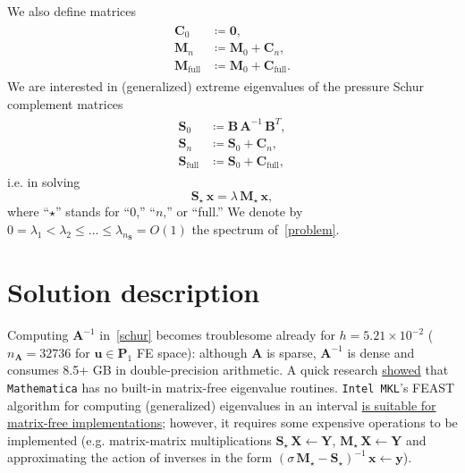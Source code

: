 \documentclass[12pt]{article}
\newcommand{\vect}[1]{\boldsymbol{\mathbf{#1}}}
\begin{document}
We also define matrices 
\begin{align}\begin{split}
	\vect C_0 &\coloneqq \vect 0,\\
	\vect M_n &\coloneqq \vect M_0 + \vect C_n,\\
	\vect M_{\text{full}} &\coloneqq \vect M_0 + \vect C_{\text{full}}.
\end{split}\end{align}
We are interested in (generalized) extreme eigenvalues of the pressure Schur complement matrices
\begin{align}\label{schur}\begin{split}
	\vect S_0 &\coloneqq \vect B\,\vect A^{-1}\,\vect B^{T},\\
	\vect S_n &\coloneqq \vect S_0 + \vect C_n,\\
	\vect S_{\text{full}} &\coloneqq \vect S_0 + \vect C_{\text{full}},
\end{split}\end{align}
i.e. in solving
\begin{equation}\label{problem}
	\vect S_\star\,\vect x = \lambda\,\vect M_\star\,\vect x,
\end{equation}
where ``$\star$'' stands for ``$0$,'' ``$n$,'' or ``full.'' We denote by~$0 = \lambda_1 < \lambda_2 \le \dots \le \lambda_{n_{\vect S}} = O(1)$ the spectrum of~\eqref{problem}.

\section{Solution description}

Computing $\vect A^{-1}$ in~\eqref{schur} becomes troublesome already for $h = 5.21\times10^{-2}$ ($n_{\vect A} = 32736$ for $\vect u \in \vect P_1$ FE space): although $\vect A$ is sparse, $\vect A^{-1}$ is dense and consumes 8.5+ GB in double-precision arithmetic. A quick research \href{https://mathematica.stackexchange.com/questions/189620/matrix-free-arnoldi-method-for-eigensystems}{showed} that \texttt{Mathematica} has no built-in matrix-free eigenvalue routines. \texttt{Intel MKL}'s FEAST algorithm for computing (generalized) eigenvalues in an interval \href{https://software.intel.com/sites/default/files/mkl-2019-developer-reference-c.pdf#_OPENTOPIC_TOC_PROCESSING_d62e853651}{is suitable for matrix-free implementations}; however, it requires some expensive operations to be implemented (e.g. matrix-matrix multiplications $\vect S_\star\,\vect X \leftarrow \vect Y$, $\vect M_\star\,\vect X \leftarrow \vect Y$ and approximating the action of inverses in the form $(\sigma\,\vect M_\star - \vect S_\star)^{-1}\,\vect x \leftarrow \vect y$).
\end{document}

